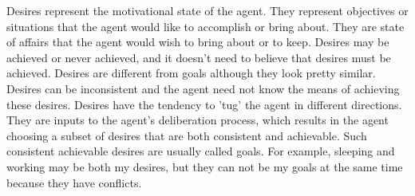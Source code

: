 Desires represent the motivational state of the agent\cite{Rao_BDITheory_1995}. They represent objectives or situations that the agent would like to accomplish or bring about. They are state of affairs that the agent would wish to bring about or to keep. Desires may be achieved or never achieved, and it doesn't need to believe that desires must be achieved. Desires are different from goals although they look pretty similar. Desires can be inconsistent and the agent need not know the means of achieving these desires. Desires have the tendency to 'tug' the agent in different directions. They are inputs to the agent's deliberation process, which results in the agent choosing a subset of desires that are both consistent and achievable. Such consistent achievable desires are usually called goals\cite{Gerhard_MultiSystem_1999}. For example, sleeping and working may be both my desires, but they can not be my goals at the same time because they have conflicts.

